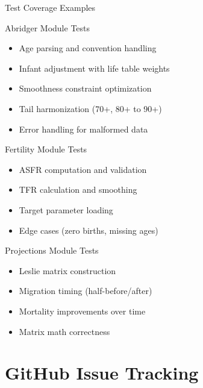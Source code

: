 \documentclass[aspectratio=169]{beamer}
\begin{document}
\begin{frame}{Test Coverage Examples}
\begin{block}{Abridger Module Tests}
\begin{itemize}
    \item Age parsing and convention handling
    \item Infant adjustment with life table weights
    \item Smoothness constraint optimization
    \item Tail harmonization (70+, 80+ to 90+)
    \item Error handling for malformed data
\end{itemize}
\end{block}

\begin{block}{Fertility Module Tests}
\begin{itemize}
    \item ASFR computation and validation
    \item TFR calculation and smoothing
    \item Target parameter loading
    \item Edge cases (zero births, missing ages)
\end{itemize}
\end{block}

\begin{block}{Projections Module Tests}
\begin{itemize}
    \item Leslie matrix construction
    \item Migration timing (half-before/after)
    \item Mortality improvements over time
    \item Matrix math correctness
\end{itemize}
\end{block}
\end{frame}

\section{GitHub Issue Tracking}
\end{document}
